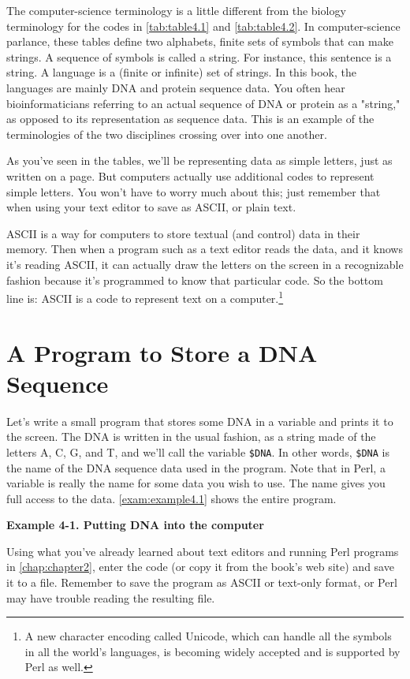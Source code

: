 The computer-science terminology is a little different from the biology terminology for the codes in \autoref{tab:table4.1} and \autoref{tab:table4.2}. In computer-science parlance, these tables define two alphabets, finite sets of symbols that can make strings. A sequence of symbols is called a string. For instance, this sentence is a string. A language is a (finite or infinite) set of strings. In this book, the languages are mainly DNA and protein sequence data. You often hear bioinformaticians referring to an actual sequence of DNA or protein as a "string," as opposed to its representation as sequence data. This is an example of the terminologies of the two disciplines crossing over into one another.

As you've seen in the tables, we'll be representing data as simple letters, just as written on a page. But computers actually use additional codes to represent simple letters. You won't have to worry much about this; just remember that when using your text editor to save as ASCII, or plain text.

ASCII is a way for computers to store textual (and control) data in their memory. Then when a program such as a text editor reads the data, and it knows it's reading ASCII, it can actually draw the letters on the screen in a recognizable fashion because it's programmed to know that particular code. So the bottom line is: ASCII is a code to represent text on a computer.\footnote{A new character encoding called Unicode, which can handle all the symbols in all the world's languages, is becoming widely accepted and is supported by Perl as well.}

\section{A Program to Store a DNA Sequence}
Let's write a small program that stores some DNA in a variable and prints it to the screen. The DNA is written in the usual fashion, as a string made of the letters A, C, G, and T, and we'll call the variable \verb|$DNA|. In other words, \verb|$DNA| is the name of the DNA sequence data used in the program. Note that in Perl, a variable is really the name for some data you wish to use. The name gives you full access to the data. \autoref{exam:example4.1} shows the entire program.

\textbf{Example 4-1. Putting DNA into the computer}


Using what you've already learned about text editors and running Perl programs in \autoref{chap:chapter2}, enter the code (or copy it from the book's web site) and save it to a file. Remember to save the program as ASCII or text-only format, or Perl may have trouble reading the resulting file.

